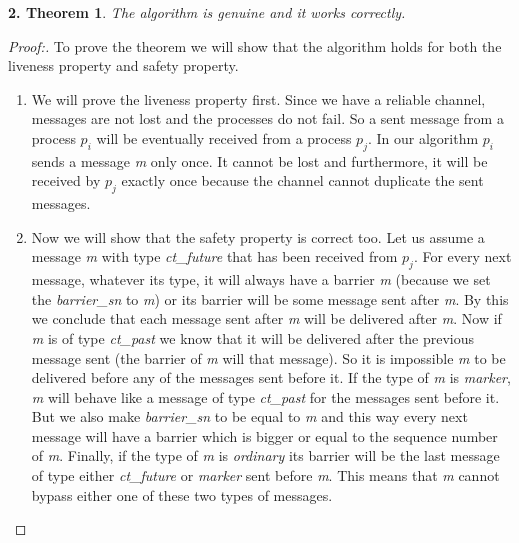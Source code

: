 \documentclass[12pt]{article}
\theoremstyle{plain}
\begin{document}
\newtheorem*{th1}{2.  Theorem}
\begin{th1}
  The algorithm is genuine and it works correctly.
\end{th1}
\begin{proof}[Proof:]
  To prove the theorem we will show that the algorithm holds for both the
  liveness property and safety property.
  \begin{enumerate}
    \item We will prove the liveness property first. Since we have a reliable
      channel, messages are not lost and the processes do not fail. So a sent 
      message from a process $p_i$ will be eventually received  from a process 
      $p_j$. In our algorithm $p_i$ sends a message \emph{m} only once. It
      cannot be lost and furthermore, it will be received by $p_j$ exactly once
      because the channel cannot duplicate the sent messages.
    \item Now we will show that the safety property is correct too. Let us
      assume a message \emph{m} with type \emph{ct\_future} that has been
      received from $p_j$. For every next message, whatever its type, it will
      always have a barrier \emph{m} (because we set the \emph{barrier\_sn} to
      \emph{m}) or its barrier will be some message sent after \emph{m}. By this
      we conclude that each message sent after \emph{m} will be delivered after
      \emph{m}.
      Now if \emph{m} is of type \emph{ct\_past} we know that it will be
      delivered after the previous message sent (the barrier of \emph{m} will
      that message). So it is impossible \emph{m} to be delivered before any of
      the messages sent before it.
      If the type of \emph{m} is \emph{marker}, \emph{m} will behave like a
      message of type \emph{ct\_past} for the messages sent before it. But we
      also make \emph{barrier\_sn} to be equal to \emph{m} and this way every
      next message will have a barrier which is bigger or equal to the sequence
      number of \emph{m}.
      Finally, if the type of \emph{m} is \emph{ordinary} its barrier will be
      the last message of type either \emph{ct\_future} or \emph{marker} sent
      before \emph{m}. This means that \emph{m} cannot bypass either one of
      these two types of messages.
  \end{enumerate}
\end{proof}

  
\end{document}
